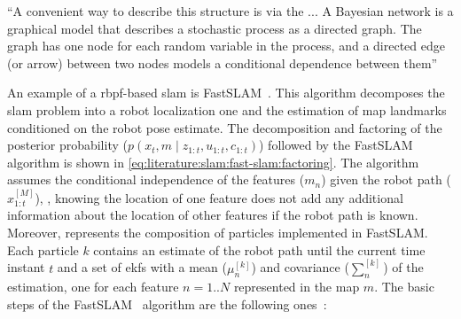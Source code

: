 \begin{definition}\label{def:literature:slam:dbn}
``A convenient way to describe this structure is via the
...
A Bayesian network is a graphical model that
describes a stochastic process as a directed graph.
The graph has one node for each random variable in the process,
and a directed edge (or arrow) between two nodes
models a conditional dependence between them''
\end{definition}

An example of a \gls{rbpf}-based \gls{slam} is
FastSLAM~\cite{montemerlo:aaai:2002,montemerlo:ijcai:2003}.
This algorithm decomposes the \gls{slam} problem into a
robot localization one and the estimation of map landmarks
conditioned on the robot pose estimate.
The decomposition and factoring of the posterior probability
($p\left(x_t,m \;\vert\; z_{1:t},u_{1:t},c_{1:t}\right)$)
followed by the FastSLAM~\cite{montemerlo:aaai:2002,montemerlo:ijcai:2003}
algorithm is shown in \eqref{eq:literature:slam:fast-slam:factoring}.
The algorithm assumes the conditional independence of the features ($m_n$)
given the robot path ($x_{1:t}^{\left[M\right]}$), \ie,
knowing the location of one feature does not add any additional information
about the location of other features if the robot path is known.
Moreover,  represents the composition of
particles implemented in FastSLAM. Each particle $k$ contains an estimate of
the robot path until the current time instant $t$ and
a set of \glspl{ekf} with a mean ($\mu_n^{\left[k\right]}$) and
covariance ($\sum_n^{\left[k\right]}$) of the estimation,
one for each feature $n=1..N$ represented in the map $m$.
The basic steps of the FastSLAM~\cite{montemerlo:aaai:2002,montemerlo:ijcai:2003}
algorithm are the following ones~\cite{thrun:book:2005}:
